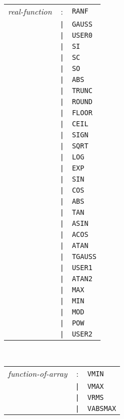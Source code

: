 \\
\begin{tabular}{p{4cm}cl}
\textit{real-function}
  &:& \texttt{RANF} \\
  &\texttt{|}& \texttt{GAUSS} \\
  &\texttt{|}& \texttt{USER0} \\
  &\texttt{|}& \texttt{SI} \\
  &\texttt{|}& \texttt{SC} \\
  &\texttt{|}& \texttt{SO} \\
  &\texttt{|}& \texttt{ABS} \\
  &\texttt{|}& \texttt{TRUNC} \\
  &\texttt{|}& \texttt{ROUND} \\
  &\texttt{|}& \texttt{FLOOR} \\
  &\texttt{|}& \texttt{CEIL} \\
  &\texttt{|}& \texttt{SIGN} \\
  &\texttt{|}& \texttt{SQRT} \\
  &\texttt{|}& \texttt{LOG} \\
  &\texttt{|}& \texttt{EXP} \\
  &\texttt{|}& \texttt{SIN} \\
  &\texttt{|}& \texttt{COS} \\
  &\texttt{|}& \texttt{ABS} \\
  &\texttt{|}& \texttt{TAN} \\
  &\texttt{|}& \texttt{ASIN} \\
  &\texttt{|}& \texttt{ACOS} \\
  &\texttt{|}& \texttt{ATAN} \\
  &\texttt{|}& \texttt{TGAUSS} \\
  &\texttt{|}& \texttt{USER1} \\
  &\texttt{|}& \texttt{ATAN2} \\
  &\texttt{|}& \texttt{MAX} \\
  &\texttt{|}& \texttt{MIN} \\
  &\texttt{|}& \texttt{MOD} \\
  &\texttt{|}& \texttt{POW} \\
  &\texttt{|}& \texttt{USER2}
\end{tabular}
\\
\begin{tabular}{p{4cm}cl}
\textit{function-of-array}
  &:& \texttt{VMIN} \\
  &\texttt{|}& \texttt{VMAX} \\
  &\texttt{|}& \texttt{VRMS} \\
  &\texttt{|}& \texttt{VABSMAX}
\end{tabular}

